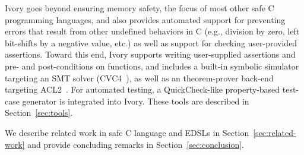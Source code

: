 Ivory goes beyond ensuring memory safety, the focus of most other safe C
programming languages, and also provides automated support for preventing errors
that result from other undefined behaviors in C (e.g., division by zero, left
bit-shifts by a negative value, etc.) as well as support for checking
user-provided assertions. Toward this end, Ivory supports writing user-supplied
assertions and pre- and post-conditions on functions, and includes a built-in
symbolic simulator targeting an SMT solver (CVC4~\cite{cvc4}), as well as an
theorem-prover back-end targeting ACL2~\cite{acl2}. For automated testing, a
QuickCheck-like property-based test-case generator is integrated into
Ivory. These tools are described in Section~\ref{sec:tools}.


We describe related work in safe C language and EDSLs in
Section~\ref{sec:related-work} and provide concluding remarks in
Section~\ref{sec:conclusion}.

